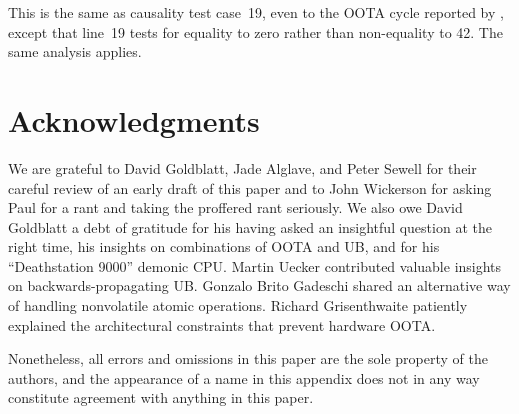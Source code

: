 \documentclass[10]{article}
\begin{document}
This is the same as causality test case~19, even to the OOTA cycle
reported by , except that line~19 tests
 for equality to zero rather than non-equality to 42.
The same analysis applies.

\clearpage

\section{Acknowledgments}
\label{sec:Acknowledgments}

We are grateful to David Goldblatt, Jade Alglave, and Peter
Sewell for their careful review of an early draft of this paper and
to John Wickerson for asking Paul for a rant and taking the proffered
rant seriously.
We also owe David Goldblatt a debt of gratitude for his having asked an
insightful question at the right time, his insights on combinations of
OOTA and UB, and for his ``Deathstation 9000'' demonic CPU.
Martin Uecker contributed valuable insights on backwards-propagating UB.
Gonzalo Brito Gadeschi shared an alternative way of handling nonvolatile
atomic operations.
Richard Grisenthwaite patiently explained the architectural constraints
that prevent hardware OOTA.

Nonetheless, all errors and omissions in this paper are the sole property
of the authors, and the appearance of a name in this appendix does
not in any way constitute agreement with anything in this paper.

\end{document}
